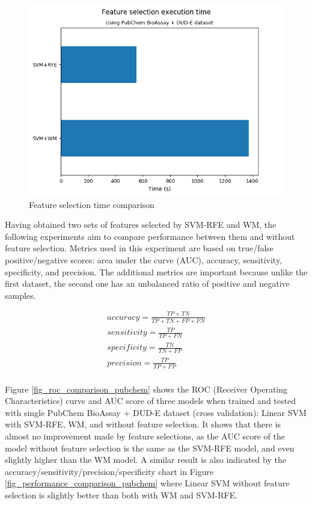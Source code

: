 \documentclass[conference]{IEEEtran}
\begin{document}
\begin{figure}
	\includegraphics[scale=0.5]{../images/feature_selection_time_comparison.png}
	\caption{Feature selection time comparison}
	\label{fig_feature_selection_time_comparison}
\end{figure}

Having obtained two sets of features selected by SVM-RFE and WM, the following experiments aim to compare performance between them and without feature selection. Metrics used in this experiment are based on true/false positive/negative scores: area under the curve (AUC), accuracy, sensitivity, specificity, and precision. The additional metrics are important because unlike the first dataset, the second one has an unbalanced ratio of positive and negative samples.

\begin{align}
	accuracy = \frac{TP + TN}{TP + TN + FP + FN} \\
	sensitivity = \frac{TP}{TP + FN} \\	
	specificity = \frac{TN}{TN + FP} \\		
	precision = \frac{TP}{TP + FP} \\			
	\label{eq_performance_metrics}
\end{align}

Figure \ref{fig_roc_comparison_pubchem} shows the ROC (Receiver Operating Characteristics) curve and AUC score of three models when trained and tested with single PubChem BioAssay + DUD-E dataset (cross validation): Linear SVM with SVM-RFE, WM, and without feature selection. It shows that there is almost no improvement made by feature selections, as the AUC score of the model without feature selection is the same as the SVM-RFE model, and even slightly higher than the WM model. A similar result is also indicated by the accuracy/sensitivity/precision/specificity chart in Figure \ref{fig_performance_comparison_pubchem} where Linear SVM without feature selection is slightly better than both with WM and SVM-RFE.
\end{document}
